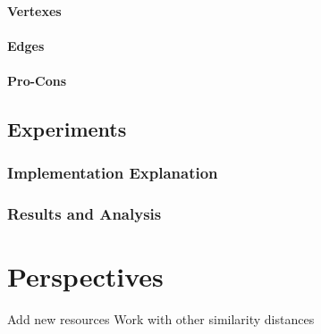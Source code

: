 \paragraph{Vertexes} %
\label{par:vertexes}

\paragraph{Edges} %
\label{par:edges}

\paragraph{Pro-Cons} %
\label{par:pro_cons}


\subsection{Experiments} %
\label{sub:experiments}
\subsubsection{Implementation Explanation} %
\label{ssub:implementation_explanation}

\subsubsection{Results and Analysis} %
\label{ssub:results_and_analysis}



\section{Perspectives} %
\label{sec:perspectives}
Add new resources
Work with other similarity distances

